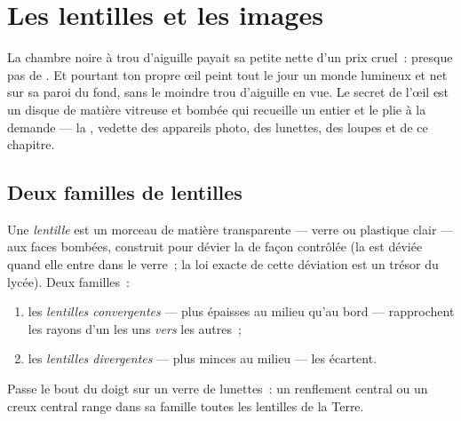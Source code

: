 \chapter{Les lentilles et les images}\label{ch:g8:lenses-images}

La chambre noire à trou d'aiguille payait sa petite  nette d'un
prix cruel~: presque pas de . Et pourtant ton propre œil peint
tout le jour un monde lumineux et net sur sa paroi du fond, sans le
moindre trou d'aiguille en vue. Le secret de l'œil est un disque de
matière vitreuse et bombée qui recueille un  entier et le
plie à la demande --- la , vedette des appareils photo, des
lunettes, des loupes et de ce chapitre.

\section{Deux familles de lentilles}

\begin{definition}\label{def:g8:lenses-images:families}
Une \emph{lentille} est un morceau de matière
transparente --- verre ou plastique clair --- aux faces bombées,
construit pour dévier la  de façon contrôlée (la  est
déviée quand elle entre dans le verre~; la loi exacte de cette
déviation est un trésor du lycée). Deux familles~:
\begin{enumerate}
  \item les \emph{lentilles convergentes}
        --- plus épaisses au milieu qu'au bord --- rapprochent les
        rayons d'un  les uns \emph{vers} les autres~;
  \item les \emph{lentilles divergentes}
        --- plus minces au milieu --- les écartent.
\end{enumerate}
Passe le bout du doigt sur un verre de lunettes~: un renflement
central ou un creux central range dans sa famille toutes les
lentilles de la Terre.
\end{definition}

